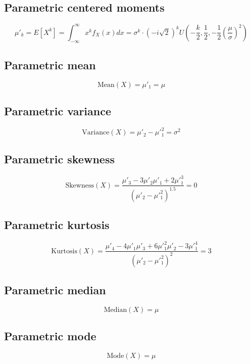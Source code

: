 \documentclass{article}
\begin{document}
\subsection{Parametric centered moments}
\begin{equation*} \mu'_{k}=E[X^k]=\int_{-\infty}^{\infty}x^{k}f_{X}\left(x\right)dx=\sigma^k\cdot (-i\sqrt 2)^k U\left(-\frac{k}{2},\frac{1}{2},-\frac{1}{2}\left(\frac \mu \sigma\right)^2\right) \end{equation*}
\subsection{Parametric mean}
\begin{equation*} \mathrm{Mean}(X)=\mu'_{1}=\mu \end{equation*}
\subsection{Parametric variance}
\begin{equation*} \mathrm{Variance}(X)=\mu'_{2}-\mu'^{2}_{1}=\sigma^{2} \end{equation*}
\subsection{Parametric skewness}
\begin{equation*} \mathrm{Skewness}(X)=\frac{\mu'_{3}-3\mu'_{2}\mu'_{1}+2\mu'^{3}_{1}}{(\mu'_{2}-\mu'^{2}_{1})^{1.5}}=0 \end{equation*}
\subsection{Parametric kurtosis}
\begin{equation*} \mathrm{Kurtosis}(X)=\frac{\mu'_{4}-4\mu'_{1}\mu'_{3}+6\mu'^{2}_{1}\mu'_{2}-3\mu'^{4}_{1}}{(\mu'_{2}-\mu'^{2}_{1})^{2}}=3 \end{equation*}
\subsection{Parametric median}
\begin{equation*} \mathrm{Median}(X)=\mu \end{equation*}
\subsection{Parametric mode}
\begin{equation*} \mathrm{Mode}(X)=\mu \end{equation*}
\end{document}
